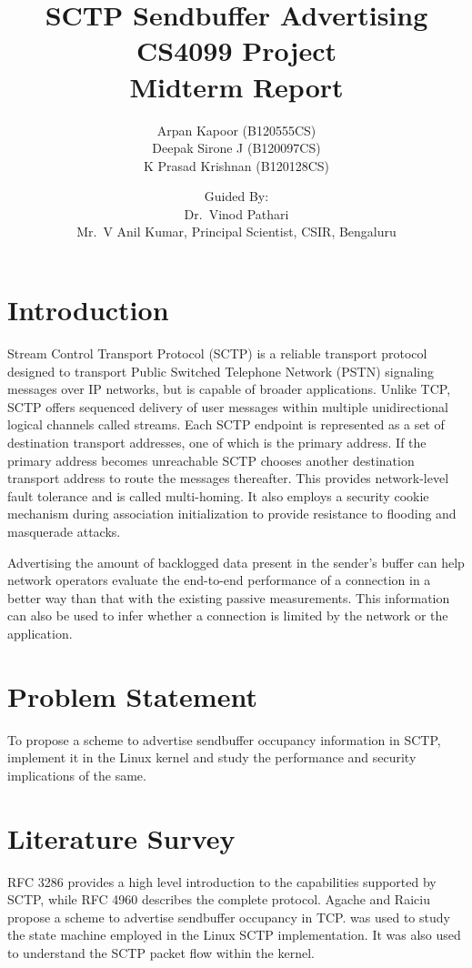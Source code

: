 \documentclass[a4paper,11pt]{article}
\title{SCTP Sendbuffer Advertising\\
  {\normalsize CS4099 Project\\
    Midterm Report}}
\author{Arpan Kapoor (B120555CS)\\
  Deepak Sirone J (B120097CS)\\
  K Prasad Krishnan (B120128CS)\and
  Guided By:\\ Dr.~Vinod Pathari\\
  Mr.~V Anil Kumar, Principal Scientist, CSIR, Bengaluru}
\begin{document}
\maketitle

\section{Introduction}
Stream Control Transport Protocol (SCTP) is a reliable transport protocol
designed to transport Public Switched Telephone Network (PSTN) signaling
messages over IP networks, but is capable of broader applications.
Unlike TCP, SCTP offers sequenced delivery of user messages within multiple
unidirectional logical channels called streams.
Each SCTP endpoint is represented as a set of destination transport addresses,
one of which is the primary address. If the primary address becomes unreachable
SCTP chooses another destination transport address to route the messages 
thereafter. This provides network-level fault tolerance and is called
multi-homing.
It also employs a security cookie mechanism during association initialization
to provide resistance to flooding and masquerade attacks.

Advertising the amount of backlogged data present in the sender's buffer can
help network operators evaluate the end-to-end performance of a connection
in a better way than that with the existing passive measurements.
This information can also be used to infer whether a connection is limited
by the network or the application.

\section{Problem Statement}
To propose a scheme to advertise sendbuffer occupancy information in SCTP,
implement it in the Linux kernel and study the performance and security
implications of the same.

\section{Literature Survey}
RFC 3286 \cite{rfc3286} provides a high level introduction to the capabilities
supported by SCTP, while RFC 4960 \cite{rfc4960} describes the complete
protocol. Agache and Raiciu \cite{tcp-sndbufadv} propose a scheme to advertise
sendbuffer occupancy in TCP. \cite{budigerelinux} was used to study the state
machine employed in the Linux SCTP implementation. It was also used to 
understand the SCTP packet flow within the kernel.
\end{document}
